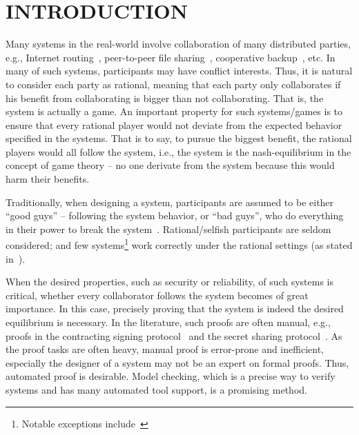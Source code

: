 \section{INTRODUCTION}%

Many systems in the real-world involve collaboration of many distributed parties, e.g., Internet routing~\cite{SP04}, peer-to-peer file sharing~\cite{BCK10}, cooperative backup~\cite{LEB03}, etc. 
In many of such systems, participants may have conflict interests. Thus, it is natural to consider each party as rational, meaning that each party only collaborates if his benefit from collaborating is bigger than not collaborating. That is, the system is actually a game. 
An important property for such systems/games is to ensure that every rational player would not deviate from the expected behavior specified in the systems. That is to say, to pursue the biggest benefit, the rational players would all follow the system, i.e., the system is the nash-equilibrium in the concept of game theory -- no one derivate from the system because this would harm their benefits.

Traditionally, when designing a system, participants are assumed to be either ``good guys'' -- following the system behavior, or ``bad guys'', who do everything in their power to break the system~\cite{AAH11}. Rational/selfish participants are seldom considered; and few systems\footnote{Notable exceptions include~\cite{AAH11,LCW06}} work correctly under the rational settings (as stated in~\cite{MMS08}). 

When the desired properties, such as security or reliability, of such systems is critical, whether every collaborator follows the system becomes of great importance. In this case, precisely proving that the system is indeed the desired equilibrium is necessary. In the literature, such proofs are often manual, e.g., proofs in the contracting signing protocol~\cite{Rabin83} and the secret sharing protocol~\cite{HT04}. As the proof tasks are often heavy, manual proof is error-prone and inefficient, especially the designer of a system may not be an expert on formal proofs. Thus, automated proof is desirable. Model checking, which is a precise way to verify systems and has many automated tool support, is a promising method.

